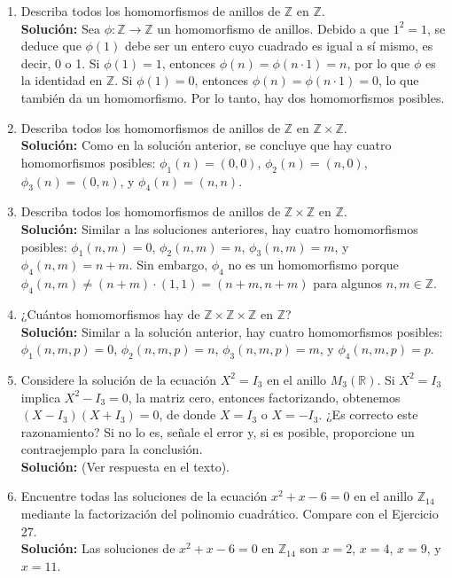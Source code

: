 \begin{enumerate}
	\item Describa todos los homomorfismos de anillos de \(\mathbb{Z}\) en \(\mathbb{Z}\).  \\
	\textbf{Solución:}
	Sea \(\phi: \mathbb{Z} \rightarrow \mathbb{Z}\) un homomorfismo de anillos. Debido a que \(1^2 = 1\), se deduce que \(\phi(1)\) debe ser un entero cuyo cuadrado es igual a sí mismo, es decir, 0 o 1. Si \(\phi(1) = 1\), entonces \(\phi(n) = \phi(n \cdot 1) = n\), por lo que \(\phi\) es la identidad en \(\mathbb{Z}\). Si \(\phi(1) = 0\), entonces \(\phi(n) = \phi(n \cdot 1) = 0\), lo que también da un homomorfismo. Por lo tanto, hay dos homomorfismos posibles.
	\item Describa todos los homomorfismos de anillos de \(\mathbb{Z}\) en \(\mathbb{Z} \times \mathbb{Z}\). \\
	\textbf{Solución:}
	Como en la solución anterior, se concluye que hay cuatro homomorfismos posibles: \(\phi_1(n) = (0, 0)\), \(\phi_2(n) = (n, 0)\), \(\phi_3(n) = (0, n)\), y \(\phi_4(n) = (n, n)\).
	\item Describa todos los homomorfismos de anillos de \(\mathbb{Z} \times \mathbb{Z}\) en \(\mathbb{Z}\). \\
	\textbf{Solución:}
	Similar a las soluciones anteriores, hay cuatro homomorfismos posibles: \(\phi_1(n, m) = 0\), \(\phi_2(n, m) = n\), \(\phi_3(n, m) = m\), y \(\phi_4(n, m) = n + m\). Sin embargo, \(\phi_4\) no es un homomorfismo porque \(\phi_4(n, m) \neq (n + m) \cdot (1, 1) = (n + m, n + m)\) para algunos \(n, m \in \mathbb{Z}\).
	\item ¿Cuántos homomorfismos hay de \(\mathbb{Z} \times \mathbb{Z} \times \mathbb{Z}\) en \(\mathbb{Z}\)? \\
	\textbf{Solución:}
	Similar a la solución anterior, hay cuatro homomorfismos posibles: \(\phi_1(n, m, p) = 0\), \(\phi_2(n, m, p) = n\), \(\phi_3(n, m, p) = m\), y \(\phi_4(n, m, p) = p\).
	\item Considere la solución de la ecuación \(X^2 = I_3\) en el anillo \(M_3(\mathbb{R})\). Si \(X^2 = I_3\) implica \(X^2 - I_3 = 0\), la matriz cero, entonces factorizando, obtenemos \((X - I_3)(X + I_3) = 0\), de donde \(X = I_3\) o \(X = -I_3\). ¿Es correcto este razonamiento? Si no lo es, señale el error y, si es posible, proporcione un contraejemplo para la conclusión. \\
	\textbf{Solución:}
	(Ver respuesta en el texto).
	\item Encuentre todas las soluciones de la ecuación \(x^2 + x - 6 = 0\) en el anillo \(\mathbb{Z}_{14}\) mediante la factorización del polinomio cuadrático. Compare con el Ejercicio 27. \\
	\textbf{Solución:}
	Las soluciones de \(x^2 + x - 6 = 0\) en \(\mathbb{Z}_{14}\) son \(x = 2\), \(x = 4\), \(x = 9\), y \(x = 11\).
\end{enumerate}


